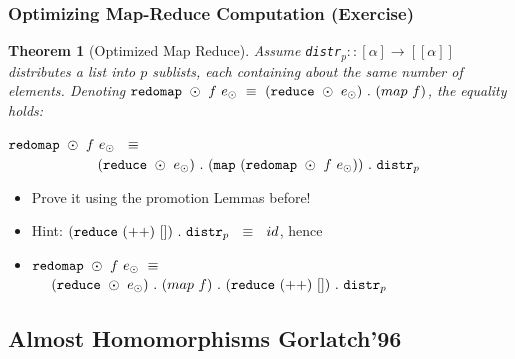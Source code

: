 \documentclass{beamer}
\renewcommand{\emph}[1]{\textcolor{structure}{#1}}
\newcommand{\emp}[1]{\textcolor{DikuRed}{ #1}}
\newtheorem{mytheo}{Theorem}
\begin{document}
\begin{frame}[fragile,t]
  \frametitle{Optimizing Map-Reduce Computation (\alert{Exercise})}

\begin{mytheo}[Optimized Map Reduce]\label{MapRed}
Assume {\tt distr$_p :: [\alpha] \rightarrow [[\alpha]]$}
distributes a list into $p$ sublists, each containing about 
the same number of elements. Denoting  
${\tt redomap }\ \odot \ f \ e_{\odot} \ \equiv \ ({\tt reduce} \ \odot \ e_{\odot}) \ . \ (map \ f)$, the equality holds:\\\bigskip

\emp{${\tt redomap} \ \odot \ f \ e_{\odot} \ \ \equiv$}\\
\emp{$\ \ \ \ \ \ \ \ \ \ \ \ \ \ \ \ \ \ \ ({\tt reduce} \ \odot \ e_{\odot}) \ . \ ({\tt map} \ ({\tt redomap} \ \odot \ f \ e_{\odot})) \ . \ {\tt distr}_p$}
\end{mytheo}

\begin{itemize}
    \item \alert{Prove it using the promotion Lemmas before!}
    \item \emph{Hint: $({\tt reduce} \ (++) \ []) \ . \ {\tt distr}_p \ \ \equiv \ \ id$, hence}
    \item \emph{${\tt redomap }\ \odot \ f \ e_{\odot} \ \equiv$\\ $\ \ \ \ ({\tt reduce} \ \odot \ e_{\odot}) \ . \ (map \ f) \ . \ ({\tt reduce} \ (++) \ []) \ . \ {\tt distr}_p$}
\end  {itemize}

\end{frame}

\subsection{Almost Homomorphisms Gorlatch'96}

\end{document}
